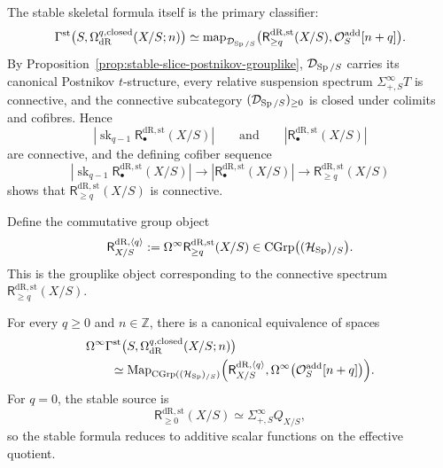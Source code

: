 The stable skeletal formula itself is the primary classifier:
\[
  \Gamma^{\mathrm{st}}
  \bigl(S,\Omega^{q,\mathrm{closed}}_{\mathrm{dR}}(X/S;n)\bigr)
  \simeq
  \operatorname{map}_{\mathcal D_{\operatorname{Sp}/S}}
  \bigl(\mathsf{R}^{\mathrm{dR},\mathrm{st}}_{\geq q}(X/S),\mathcal O_S^{\mathrm{add}}[n+q]\bigr).
\]
By Proposition~\ref{prop:stable-slice-postnikov-grouplike},
\(\mathcal D_{\operatorname{Sp}/S}\) carries its canonical Postnikov \(t\)-structure, every relative
suspension spectrum \(\Sigma^\infty_{+,S}T\) is connective, and the connective
subcategory \((\mathcal D_{\operatorname{Sp}/S})_{\geq0}\) is closed under colimits and cofibres.
Hence
\[
  |\operatorname{sk}_{q-1}\mathsf{R}^{\mathrm{dR},\mathrm{st}}_\bullet(X/S)|
  \qquad\text{and}\qquad
  |\mathsf{R}^{\mathrm{dR},\mathrm{st}}_\bullet(X/S)|
\]
are connective, and the defining cofiber sequence
\[
  |\operatorname{sk}_{q-1}\mathsf{R}^{\mathrm{dR},\mathrm{st}}_\bullet(X/S)|
  \longrightarrow
  |\mathsf{R}^{\mathrm{dR},\mathrm{st}}_\bullet(X/S)|
  \longrightarrow
  \mathsf{R}^{\mathrm{dR},\mathrm{st}}_{\geq q}(X/S)
\]
shows that \(\mathsf{R}^{\mathrm{dR},\mathrm{st}}_{\geq q}(X/S)\) is connective.

\begin{construction}
Define the commutative group object
\[
  \mathsf{R}^{\mathrm{dR},\langle q\rangle}_{X/S}
  :=
  \Omega^\infty \mathsf{R}^{\mathrm{dR},\mathrm{st}}_{\geq q}(X/S)
  \in
  \operatorname{CGrp}
  \bigl((\mathcal H_{\operatorname{Sp}})_{/S}\bigr).
\]
This is the grouplike object corresponding to the connective spectrum
\(\mathsf{R}^{\mathrm{dR},\mathrm{st}}_{\geq q}(X/S)\).
\end{construction}

\begin{theorem}
\label{thm:additive-delooping-expanded}
For every \(q\geq0\) and \(n\in\mathbb Z\), there is a canonical equivalence of
spaces
\[
\begin{aligned}
  &\Omega^\infty
  \Gamma^{\mathrm{st}}
  \bigl(S,\Omega^{q,\mathrm{closed}}_{\mathrm{dR}}(X/S;n)\bigr)
  \\
  &\qquad\simeq
  \operatorname{Map}_{\operatorname{CGrp}((\mathcal H_{\operatorname{Sp}})_{/S})}
  \Bigl(
     \mathsf{R}^{\mathrm{dR},\langle q\rangle}_{X/S},
     \Omega^\infty\bigl(\mathcal O_S^{\mathrm{add}}[n+q]\bigr)
  \Bigr).
\end{aligned}
\]
For \(q=0\), the stable source is
\[
  \mathsf{R}^{\mathrm{dR},\mathrm{st}}_{\geq0}(X/S)
  \simeq
  \Sigma^\infty_{+,S}Q_{X/S},
\]
so the stable formula reduces to additive scalar functions on the effective quotient.
\end{theorem}

